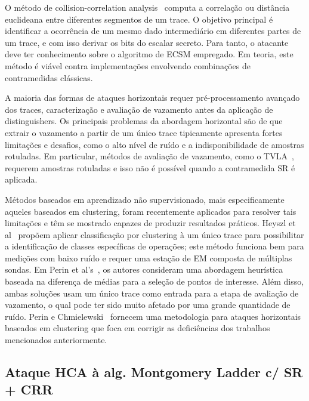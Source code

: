 O método de collision-correlation analysis~\cite{Bauer2013_CTRSA, Bauer2013, Clavier2012_Indocrypt, WittemanWoundenbergMenari2011, Walter2001_Ches} computa a correlação ou distância euclideana entre diferentes segmentos de um trace. O objetivo principal é identificar a ocorrência de um mesmo dado intermediário em diferentes partes de um trace, e com isso derivar os bits do escalar secreto. Para tanto, o atacante deve ter conhecimento sobre o algoritmo de ECSM empregado. Em teoria, este método é viável contra implementações envolvendo combinações de contramedidas clássicas.

A maioria das formas de ataques horizontais requer pré-processamento avançado dos traces, caracterização e avaliação de vazamento antes da aplicação de distinguishers. Os principais problemas da abordagem horizontal são de que extrair o vazamento a partir de um único trace tipicamente apresenta fortes limitações e desafios, como o alto nível de ruído e a indisponibilidade de amostras rotuladas. Em particular, métodos de avaliação de vazamento, como o TVLA~\cite{Goodwill2011}, requerem amostras rotuladas e isso não é possível quando a contramedida SR é aplicada.

Métodos baseados em aprendizado não supervisionado, mais especificamente aqueles baseados em clustering, foram recentemente aplicados para resolver tais limitações e têm se mostrado capazes de produzir resultados práticos. Heyszl et al~\cite{Heyszl2013} propõem aplicar classificação por clustering à um único trace para possibilitar a identificação de classes específicas de operações; este método funciona bem para medições com baixo ruído e requer uma estação de EM composta de múltiplas sondas. Em Perin et al's~\cite{Perin2014}, os autores consideram uma abordagem heurística baseada na diferença de médias para a seleção de pontos de interesse. Além disso, ambas soluções usam um único trace como entrada para a etapa de avaliação de vazamento, o qual pode ter sido muito afetado por uma grande quantidade de ruído. Perin e Chmielewski~\cite{PerinChmielewski2015} fornecem uma metodologia para ataques horizontais baseados em clustering que foca em corrigir as deficiências dos trabalhos mencionados anteriormente.

\subsection{Ataque HCA à alg. Montgomery Ladder c/ SR + CRR}



